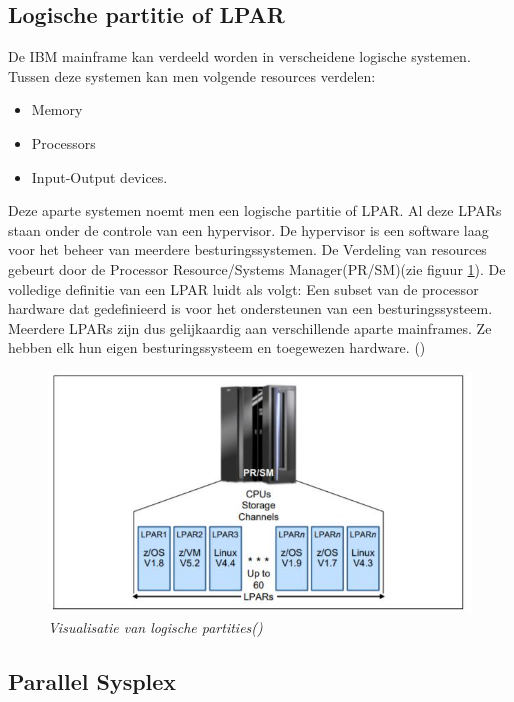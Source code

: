 \subsection{Logische partitie of LPAR}
\label{subsec:Logische partitie of LPAR}
De IBM mainframe kan verdeeld worden in verscheidene logische systemen. Tussen deze systemen kan men volgende resources verdelen:
\begin{itemize}
	\item Memory
	\item Processors
	\item Input-Output devices.
\end{itemize}
Deze aparte systemen noemt men een logische partitie of LPAR. Al deze LPARs staan onder de controle van een hypervisor. De hypervisor is een software laag voor het beheer van meerdere besturingssystemen. De Verdeling van resources gebeurt door de Processor Resource/Systems Manager(PR/SM)(zie figuur \ref{fig:lpar}). De volledige definitie van een LPAR luidt als volgt: Een subset van de processor hardware dat gedefinieerd is voor het ondersteunen van een besturingssysteem. Meerdere LPARs zijn dus gelijkaardig aan verschillende aparte mainframes. Ze hebben elk hun eigen besturingssysteem en toegewezen hardware. (\cite{Ebbers2011})

\begin{figure}[h]
	\centering
	\includegraphics{img/LPAR}
	\caption[Logische Partities]{{\small \textit{Visualisatie van logische partities(\cite{Ebbers2011})}}}
	\label{fig:lpar}
\end{figure}


\subsection{Parallel Sysplex}
\label{subsec:Parallel Sysplex}

